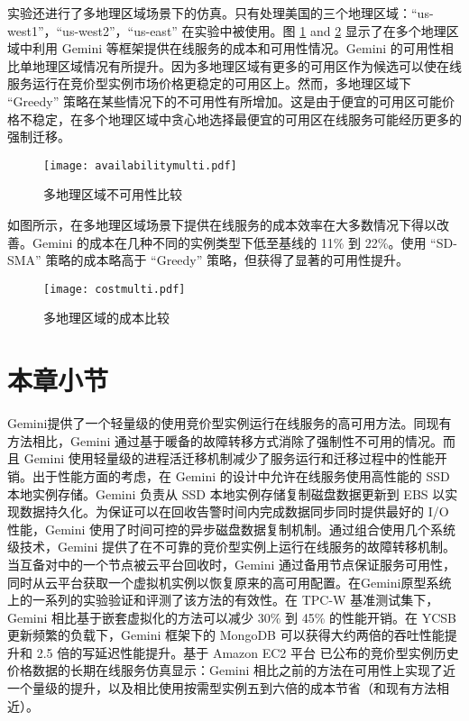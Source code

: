 实验还进行了多地理区域场景下的仿真。只有处理美国的三个地理区域：``us-west1''，``us-west2''，``us-east'' 在实验中被使用。图 \ref{figure:unavailabilitymulti} and \ref{figure:costmulti} 显示了在多个地理区域中利用 Gemini 等框架提供在线服务的成本和可用性情况。Gemini 的可用性相比单地理区域情况有所提升。因为多地理区域有更多的可用区作为候选可以使在线服务运行在竞价型实例市场价格更稳定的可用区上。然而，多地理区域下 ``Greedy'' 策略在某些情况下的不可用性有所增加。这是由于便宜的可用区可能价格不稳定，在多个地理区域中贪心地选择最便宜的可用区在线服务可能经历更多的强制迁移。
\begin{figure}[]
  \centering
  \texttt{[image: availabilitymulti.pdf]}
  \caption{多地理区域不可用性比较}
  \label{figure:unavailabilitymulti}
\end{figure}

如图所示，在多地理区域场景下提供在线服务的成本效率在大多数情况下得以改善。Gemini 的成本在几种不同的实例类型下低至基线的 11\% 到 22\%。使用 ``SD-SMA'' 策略的成本略高于 ``Greedy'' 策略，但获得了显著的可用性提升。
\begin{figure}[]
  \centering
  \texttt{[image: costmulti.pdf]}
  \caption{多地理区域的成本比较}
  \label{figure:costmulti}
\end{figure}

\section{本章小节}
Gemini提供了一个轻量级的使用竞价型实例运行在线服务的高可用方法。同现有方法相比，Gemini 通过基于暖备的故障转移方式消除了强制性不可用的情况。而且 Gemini 使用轻量级的进程活迁移机制减少了服务运行和迁移过程中的性能开销。出于性能方面的考虑，在 Gemini 的设计中允许在线服务使用高性能的 SSD 本地实例存储。Gemini 负责从 SSD 本地实例存储复制磁盘数据更新到 EBS 以实现数据持久化。为保证可以在回收告警时间内完成数据同步同时提供最好的 I/O 性能，Gemini 使用了时间可控的异步磁盘数据复制机制。通过组合使用几个系统级技术，Gemini 提供了在不可靠的竞价型实例上运行在线服务的故障转移机制。当互备对中的一个节点被云平台回收时，Gemini 通过备用节点保证服务可用性，同时从云平台获取一个虚拟机实例以恢复原来的高可用配置。在Gemini原型系统上的一系列的实验验证和评测了该方法的有效性。在 TPC-W 基准测试集下，Gemini 相比基于嵌套虚拟化的方法可以减少 30\% 到 45\% 的性能开销。在 YCSB 更新频繁的负载下，Gemini 框架下的 MongoDB 可以获得大约两倍的吞吐性能提升和 2.5 倍的写延迟性能提升。基于 Amazon EC2 平台 已公布的竞价型实例历史价格数据的长期在线服务仿真显示：Gemini 相比之前的方法在可用性上实现了近一个量级的提升，以及相比使用按需型实例五到六倍的成本节省（和现有方法相近）。
